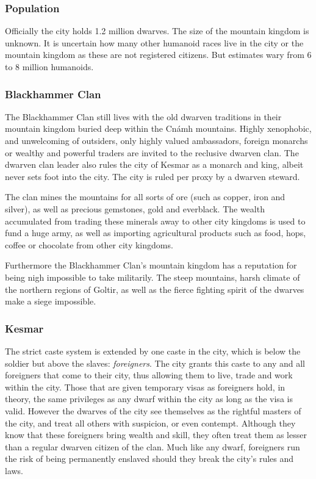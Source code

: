 \subsubsection{Population}

Officially the city holds 1.2 million dwarves. The size of the mountain
kingdom is unknown. It is uncertain how many other humanoid races live in
the city or the mountain kingdom as these are not registered citizens. But
estimates wary from 6 to 8 million humanoids.

\subsubsection{Blackhammer Clan}
\label{sec:Blackhammer Clan}

The Blackhammer Clan still lives with the old dwarven traditions in their
mountain kingdom buried deep within the Cnámh mountains. Highly xenophobic,
and unwelcoming of outsiders, only highly valued ambassadors, foreign monarchs
or wealthy and powerful traders are invited to the reclusive dwarven clan. The
dwarven clan leader also rules the city of Kesmar as a monarch and king,
albeit never sets foot into the city. The city is ruled per proxy by a dwarven
steward.

The clan mines the mountains for all sorts of ore (such as copper, iron and
silver), as well as precious gemstones, gold and everblack. The wealth
accumulated from trading these minerals away to other city kingdoms is used to
fund a huge army, as well as importing agricultural products such as food,
hops, coffee or chocolate from other city kingdoms.

Furthermore the Blackhammer Clan's mountain kingdom has a reputation for being
nigh impossible to take militarily. The steep mountains, harsh climate of the
northern regions of Goltir, as well as the fierce fighting spirit of the dwarves
make a siege impossible.

\subsubsection{Kesmar}

The strict caste system is extended by one caste in the city, which is below
the soldier but above the slaves: \emph{foreigners}. The city grants this
caste to any and all foreigners that come to their city, thus allowing them to
live, trade and work within the city. Those that are given temporary visas as
foreigners hold, in theory, the same privileges as any dwarf within the city
as long as the visa is valid. However the dwarves of the city see themselves
as the rightful masters of the city, and treat all others with suspicion, or
even contempt. Although they know that these foreigners bring wealth and skill,
they often treat them as lesser than a regular dwarven citizen of the clan.
Much like any dwarf, foreigners run the risk of being permanently enslaved
should they break the city's rules and laws.

